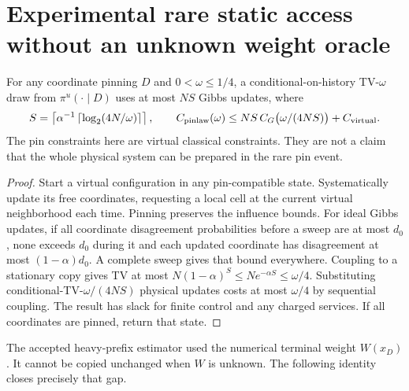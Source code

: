 \section{Experimental rare static access without an unknown weight oracle}

\begin{lemma}\label{lem:pinned}
For any coordinate pinning $D$ and $0<\omega\le1/4$, a conditional-on-history
TV-$\omega$ draw from $\pi^u(\cdot\mid D)$ uses at most $NS$ Gibbs updates,
where
\[
 S=\left\lceil\alpha^{-1}\left\lceil\log_2(4N/\omega)\right\rceil\right\rceil,
 \qquad
 C_{\rm pinlaw}(\omega)\le
 NS\,C_G\bigl(\omega/(4NS)\bigr)+C_{\rm virtual}.
\]
The pin constraints here are virtual classical constraints. They are not a
claim that the whole physical system can be prepared in the rare pin event.
\end{lemma}
\begin{proof}
Start a virtual configuration in any pin-compatible state. Systematically
update its free coordinates, requesting a local cell at the current virtual
neighborhood each time. Pinning preserves the influence bounds.
For ideal Gibbs updates, if all coordinate disagreement probabilities before
a sweep are at most $d_0$, none exceeds $d_0$ during it and each updated
coordinate has disagreement at most $(1-\alpha)d_0$. A complete sweep gives
that bound everywhere. Coupling to a stationary copy gives TV at most
$N(1-\alpha)^S\le Ne^{-\alpha S}\le\omega/4$.
Substituting conditional-TV-$\omega/(4NS)$ physical updates costs at most
$\omega/4$ by sequential coupling. The result has slack for finite control
and any charged services. If all coordinates are pinned, return that state.
\end{proof}

The accepted heavy-prefix estimator used the numerical terminal weight
$W(x_D)$. It cannot be copied unchanged when $W$ is unknown. The following
identity closes precisely that gap.

